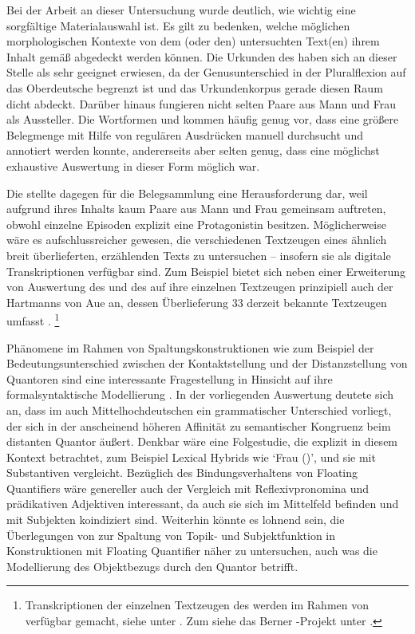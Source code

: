 Bei der Arbeit an dieser Untersuchung wurde deutlich, wie wichtig eine
sorgfältige Material\-auswahl ist. Es gilt zu bedenken, welche möglichen
morphologischen Kontexte von dem (oder den) untersuchten Text(en) ihrem Inhalt
gemäß abgedeckt werden können. Die Urkunden des \CAO{} haben sich an dieser
Stelle als sehr geeignet erwiesen, da der Genusunterschied in der Pluralflexion
auf das Oberdeutsche begrenzt ist und das Urkundenkorpus gerade
diesen Raum dicht abdeckt. Darüber hinaus fungieren nicht
selten Paare aus Mann und Frau als Aussteller. Die Wortformen  und
 kommen häufig genug vor, dass eine größere Belegmenge mit Hilfe
von regulären Ausdrücken manuell durchsucht und annotiert werden konnte,
andererseits aber selten genug, dass eine möglichst exhaustive Auswertung in
dieser Form möglich war.

Die \KC{} stellte dagegen für die Belegsammlung eine Herausforderung
dar, weil aufgrund ihres Inhalts kaum Paare aus Mann und Frau gemeinsam
auftreten, obwohl einzelne Episoden explizit eine Protagonistin besitzen.
Möglicherweise wäre es aufschlussreicher gewesen, die verschiedenen Textzeugen
eines ähnlich breit überlieferten, erzählenden Texts zu untersuchen -- insofern
sie als digitale Transkriptionen verfügbar sind. Zum Beispiel bietet sich neben
einer Erweiterung von  Auswertung des
 und des  auf ihre einzelnen Textzeugen prinzipiell
auch der  Hartmanns von Aue an, dessen Überlieferung 33 derzeit
bekannte Textzeugen umfasst \autocites[vgl.][s.\,v.~\textit{Hartmann von Aue:
}]{hsc}.%
%
	\footnote{Transkriptionen der einzelnen Textzeugen des  werden
		im Rahmen von  verfügbar gemacht, siehe unter
		. Zum  siehe das Berner
		-Projekt unter .%
	}

Phänomene im Rahmen von Spaltungskonstruktionen wie zum Beispiel der
Bedeutungs\-unterschied zwischen der Kontaktstellung und der Distanzstellung
von Quantoren sind eine interessante Fragestellung in Hinsicht auf ihre
formal\-syntaktische Modellierung \autocite[siehe
z.\,B.][]{pittner1995,merchant1996,fanselowcavar2002,nolda2007,shen2019}. In
der vorliegenden Auswertung deutete sich an, dass im auch
Mittelhochdeutschen ein grammatischer Unterschied
vorliegt, der sich in der anscheinend höheren Affinität zu semantischer
Kongruenz beim distanten Quantor äußert. Denkbar wäre eine Folgestudie, die
explizit   in diesem Kontext
betrachtet, zum Beispiel Lexical Hybrids wie  `Frau (\NeutF)', und
sie mit  Substantiven vergleicht. Bezüglich des
Bindungsverhaltens von Floating Quantifiers wäre genereller auch
der Vergleich mit Reflexivpronomina und prädikativen
Adjektiven interessant, da auch sie sich im Mittelfeld
befinden und mit Subjekten koindiziert sind. Weiterhin könnte es lohnend sein,
die Überlegungen von \citet{spector2009} zur Spaltung von Topik- und
Subjektfunktion in Konstruktionen mit Floating Quantifier näher zu untersuchen,
auch was die Modellierung des Objektbezugs durch den Quantor betrifft.

